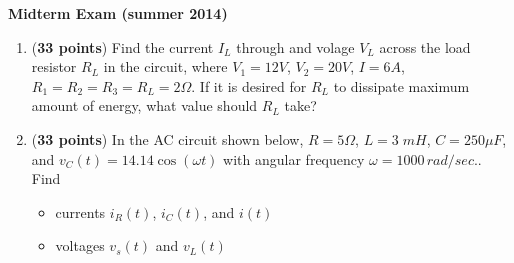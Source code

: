 \usepackage{html}

\begin{center}
{\Large \bf  Midterm Exam (summer 2014)}
\end{center}

\begin{enumerate}

\item ({\bf 33 points}) 
  Find the current $I_L$ through and volage $V_L$ across the load resistor
  $R_L$ in the circuit, where $V_1=12V$, $V_2=20V$, $I=6A$, 
  $R_1=R_2=R_3=R_L=2\Omega$. If it is desired for $R_L$ to dissipate maximum 
  amount of energy, what value should $R_L$ take?


  \begin{comment}
  {\bf Solution:} Use Thevinen's theorem. 
  \begin{itemize}
  \item Find $V_{Th}$. Convert $V_1$ and $R_1$ to an equivalent current source
    of $12V/2\Omega=2A$ in parallel with $R_1$. Convert $V_2$ and $R_2$ to
    an equivalent current source of $20V/2\Omega=10A$ in parallel with $R_2$
    Then the three currents in parallel can be combined into a single current
    source of $6+6+10=22A$ in parallel with a single resistance 
    $R_{Th}=R_1||R_2|R_3=2/3\Omega$, $V_{Th}=V_{OC}=22\times 2/3=44/3V$.
  \item Find $I_L$ and $V_L$:
    \[
    I_L=\frac{V_{Th}}{R_{Th}+R_L}=\frac{44/3}{2/3+2}=\frac{11}{2}=5.5,
    \;\;\;\;\;\;
    V_L=I_L\times R_L=11
    \]    
  \item For $R_L$ to consume maximum energy, $R_L=R_{Th}=2/3\Omega$.
  \end{itemize}
  \end{comment}

\item ({\bf 33 points}) 
  In the AC circuit shown below, $R=5\Omega$, $L=3\;mH$, $C=250\mu F$, and 
  $v_C(t)=14.14\cos(\omega t)$ with angular frequency $\omega=1000\,rad/sec.$.
  Find 
  \begin{itemize}
  \item currents $i_R(t)$, $i_C(t)$, and $i(t)$
  \item voltages $v_s(t)$ and $v_L(t)$
  \end{itemize}
  

  \begin{comment}


\end{comment}
\end{enumerate}
